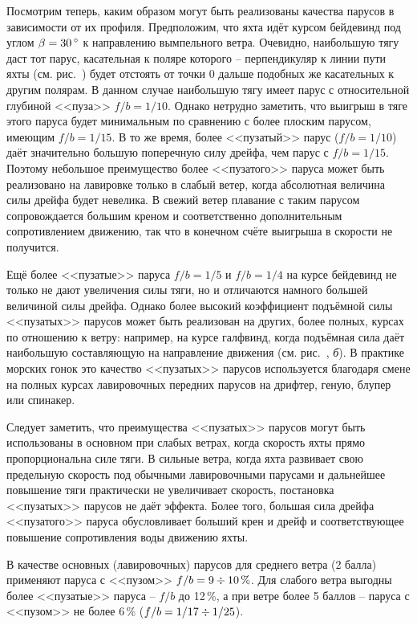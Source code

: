 Посмотрим теперь, каким образом могут быть реализованы качества
парусов в зависимости от их профиля. Предположим, что яхта идёт курсом
бейдевинд под углом $\beta = 30\,^\circ$ к направлению вымпельного
ветра. Очевидно, наибольшую тягу даст тот парус, касательная к поляре
которого \--- перпендикуляр к линии пути яхты (см. рис.~)
будет отстоять от точки 0 дальше подобных же касательных к другим
полярам. В данном случае наибольшую тягу имеет парус с относительной
глубиной <<пуза>> $f/b=1/10$. Однако нетрудно заметить, что выигрыш в
тяге этого паруса будет минимальным по сравнению с более плоским
парусом, имеющим $f/b = 1/15$. В то же время, более <<пузатый>> парус
($f/b = 1/10$) даёт значительно большую поперечную силу дрейфа, чем
парус с $f/b = 1/15$. Поэтому небольшое преимущество более
<<пузатого>> паруса может быть реализовано на лавировке только в
слабый ветер, когда абсолютная величина силы дрейфа будет невелика. В
свежий ветер плавание с таким парусом сопровождается большим креном и
соответственно дополнительным сопротивлением движению, так что в
конечном счёте выигрыша в скорости не получится.

Ещё более <<пузатые>> паруса $f/b=1/5$ и $f/b=1/4$ на курсе бейдевинд
не только не дают увеличения силы тяги, но и отличаются намного
большей величиной силы дрейфа. Однако более высокий коэффициент
подъёмной силы <<пузатых>> парусов может быть реализован на других,
более полных, курсах по отношению к ветру: например, на курсе
галфвинд, когда подъёмная сила даёт наибольшую составляющую на
направление движения (см. рис.~, \textit{б}). В практике
морских гонок это качество <<пузатых>> парусов используется благодаря
смене на полных курсах лавировочных передних парусов на дрифтер, геную,
блупер или спинакер.

Следует заметить, что преимущества <<пузатых>> парусов могут быть
использованы в основном при слабых ветрах, когда скорость яхты прямо
пропорциональна силе тяги. В сильные ветра, когда яхта развивает свою
предельную скорость под обычными лавировочными парусами и дальнейшее
повышение тяги практически не увеличивает скорость, постановка
<<пузатых>> парусов не даёт эффекта. Более того, большая сила дрейфа
<<пузатого>> паруса обусловливает больший крен и дрейф и
соответствующее повышение сопротивления воды движению яхты.

В качестве основных (лавировочных) парусов для среднего ветра (2 балла) применяют паруса с <<пузом>> $f/b=9\div 10\,\%$. Для
слабого ветра выгодны более <<пузатые>> паруса \--- $f/b$ до 12\,\%, а
при ветре более 5 баллов \--- паруса с <<пузом>> не более 6\,\%
($f/b=1/17\div 1/25$).

